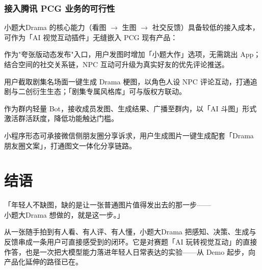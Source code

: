 \documentclass[10pt, a4paper]{article}
\newcommand{\kw}[1]{\textbf{#1}}
\begin{document}
\subsubsection*{接入腾讯 PCG 业务的可行性}

\vspace{2pt}
小题大Drama 的核心能力（看图 $\to$ 生图 $\to$ 社交反馈）具备较低的接入成本，可作为「AI 视觉互动插件」无缝嵌入 PCG 现有产品：

\vspace{3pt}
\begin{description}[leftmargin=0em, style=nextline, itemsep=0.4em, topsep=2pt]
  \item[\kw{QQ 空间}] 作为"夸张版动态发布"入口，用户发图时增加「小题大作」选项，无需跳出 App；结合空间的社交关系链，NPC 互动可升级为真实好友的优先评论推送。

  \item[\kw{腾讯视频}] 用户截取剧集名场面一键生成 Drama 梗图，以角色人设 NPC 评论互动，打通追剧与二创衍生生态；「剧集专属风格库」可与版权方联动。

  \item[\kw{QQ 群聊 / 频道}] 作为群内轻量 Bot，接收成员发图、生成结果、广播至群内，以「AI 斗图」形式激活群活跃度，降低功能触达门槛。

  \item[\kw{微信（生态延伸）}] 小程序形态可承接微信侧朋友圈分享诉求，用户生成图片一键生成配套「Drama 朋友圈文案」，打通图文一体化分享链路。
\end{description}

\section*{结语}

\begin{center}
「年轻人不缺图，缺的是让一张普通图片值得发出去的那一步——\\[0.35em]
小题大Drama 想做的，就是这一步。」
\end{center}

\noindent 从一张随手拍到有人看、有人评、有人懂，小题大Drama 把感知、决策、生成与反馈串成一条用户可直接感受到的闭环。它是对赛题「AI 玩转视觉互动」的直接作答，也是一次把大模型能力落进年轻人日常表达的实验——从 Demo 起步，向产品化延伸的路径已在。
\end{document}
